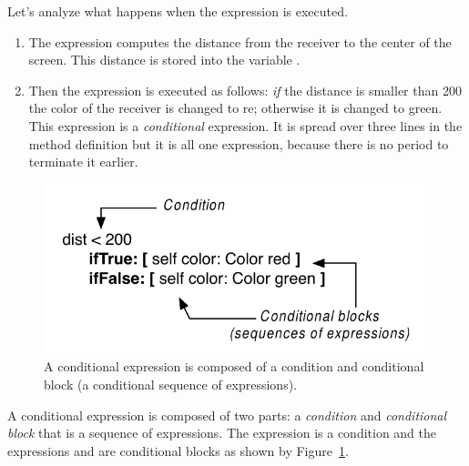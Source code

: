Let's analyze what happens when the expression  is executed. 

\begin{enumerate}
\item The expression  computes the distance from the receiver to the center of the screen. This distance is stored into the variable . 

\item Then the expression  is executed as follows: \textit{if} the distance is smaller than 200 the color of the receiver is changed to re; otherwise it is changed to green. This expression is a \textit{conditional} expression. It is spread over three lines in the method definition but it is all one expression, because there is no period to terminate it earlier.
\end{enumerate}

\begin{figure}[h]
\begin{center}
\includegraphics{distanceDetector}
\caption{A conditional expression is composed of a condition and conditional block (a conditional sequence of expressions).\label{fig:distanceDetector}}
\end{center}
\end{figure}

A conditional expression is composed of two parts: a \textit{condition} and  \textit{conditional block} that is a sequence of expressions. 
The expression  is a condition and the expressions  and  are conditional blocks  as shown by Figure~\ref{fig:distanceDetector}. 


